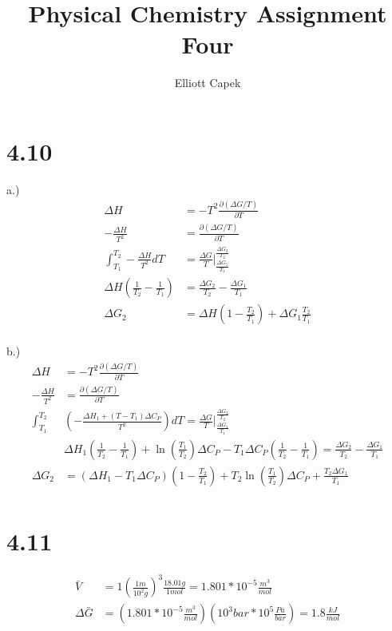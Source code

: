 \documentclass[10pt]{article} %
\title{Physical Chemistry Assignment Four}
\author{Elliott Capek}
\begin{document}
\maketitle{}

\section{4.10}

a.)
\begin{align*}
  \Delta H &= -T^2\frac{\partial (\Delta G/T)}{\partial T}\\
  -\frac{\Delta H}{T^2} &= \frac{\partial (\Delta G/T)}{\partial T}\\
  \int_{T_1}^{T_2} -\frac{\Delta H}{T^2}dT &= \frac{\Delta G}{T}\Bigg|_{\frac{\Delta G_1}{T_1}}^{\frac{\Delta G_2}{T_2}}\\
  \Delta H\left(\frac{1}{T_2} - \frac{1}{T_1}\right) &= \frac{\Delta G_2}{T_2} - \frac{\Delta G_1}{T_1}\\
  \Delta G_2 &= \Delta H\left(1 - \frac{T_2}{T_1}\right) + \Delta G_1 \frac{T_2}{T_1}\\
\end{align*}

b.)
\begin{align*}
  \Delta H &= -T^2\frac{\partial (\Delta G/T)}{\partial T}\\
  -\frac{\Delta H}{T^2} &= \frac{\partial (\Delta G/T)}{\partial T}\\
  \int_{T_1}^{T_2} &\left(-\frac{\Delta H_1 + (T-T_1)\Delta C_P}{T^2}\right)dT = \frac{\Delta G}{T}\Bigg|_{\frac{\Delta G_1}{T_1}}^{\frac{\Delta G_2}{T_2}}\\
  &\Delta H_1\left(\frac{1}{T_2}-\frac{1}{T_1}\right) + \ln\left(\frac{T_1}{T_2}\right)\Delta C_P - T_1\Delta C_P\left(\frac{1}{T_2}-\frac{1}{T_1}\right) = \frac{\Delta G_2}{T_2} - \frac{\Delta G_1}{T_1}\\
  \Delta G_2 &= \left(\Delta H_1 - T_1\Delta C_P\right)\left(1 - \frac{T_2}{T_1}\right) + T_2\ln\left(\frac{T_1}{T_2}\right)\Delta C_P + \frac{T_2\Delta G_1}{T_1}\\
\end{align*}

\section{4.11}
\begin{align*}
  \bar{V} &= 1 \left(\frac{1 m}{10^2 g}\right)^3 \frac{18.01 g}{1 mol} = 1.801 * 10^{-5} \frac{m^3}{mol}\\
  \Delta\bar{G} &= \left(1.801 * 10^{-5} \frac{m^3}{mol}\right)\left(10^3 bar * 10^5 \frac{Pa}{bar}\right) = 1.8 \frac{kJ}{mol}\\
\end{align*}
\end{document}
